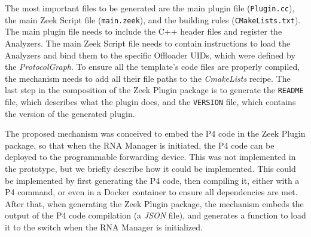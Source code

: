 The most important files to be generated are the main plugin file (\texttt{Plugin.cc}), the main Zeek Script file (\texttt{main.zeek}), and the building rules (\texttt{CMakeLists.txt}). The main plugin file needs to include the C++ header files and register the Analyzers. The main Zeek Script file needs to contain instructions to load the Analyzers and bind them to the specific Offloader UIDs, which were defined by the \textit{ProtocolGraph}. To ensure all the template's code files are properly compiled, the mechanism needs to add all their file paths to the \textit{CmakeLists} recipe. The last step in the composition of the Zeek Plugin package is to generate the \texttt{README} file, which describes what the plugin does, and the \texttt{VERSION} file, which contains the version of the generated plugin.

The proposed mechanism was conceived to embed the P4 code in the Zeek Plugin package, so that when the RNA Manager is initiated, the P4 code can be deployed to the programmable forwarding device. This was not implemented in the prototype, but we briefly describe how it could be implemented. This could be implemented by first generating the P4 code, then compiling it, either with a P4 command, or even in a Docker container to ensure all dependencies are met. After that, when generating the Zeek Plugin package, the mechanism embeds the output of the P4 code compilation (a \textit{JSON} file), and generates a function to load it to the switch when the RNA Manager is initialized.

% 
% 
